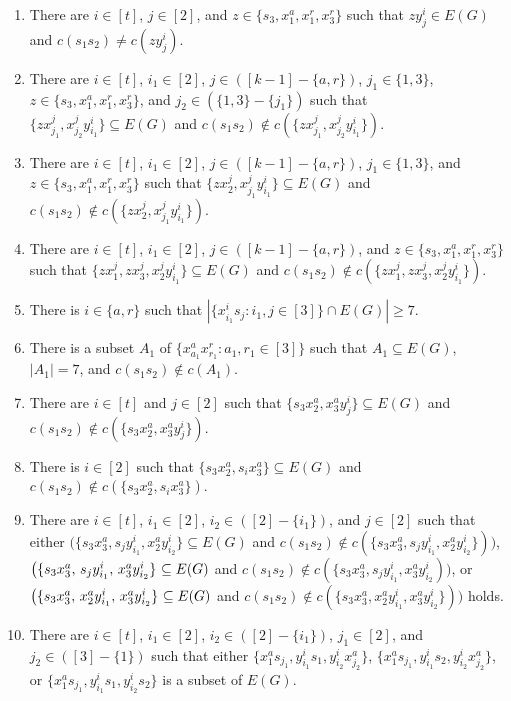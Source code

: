 \documentclass[12pt]{article}
\begin{document}
 \begin{enumerate}
   \item There are $i\in[t]$, $j\in[2]$, and $z\in\{s_3,x^a_1,x_1^r,x_3^r\}$ such that $zy^i_j\in E(G)$ and $c(s_1s_2)\neq c(zy^i_j)$. 
    \item There are $i\in[t]$, $i_1\in[2]$, $j\in([k-1]-\{a,r\})$, $j_1\in\{1,3\}$, $z\in\{s_3,x_1^a,x^r_1,x^r_3\}$, and $j_2\in(\{1,3\}-\{j_1\})$ such that $\{zx^j_{j_1},x^j_{j_2}y^i_{i_1}\}\subseteq E(G)$ and $c(s_1s_2)\not\in c(\{zx^j_{j_1},x^j_{j_2}y^i_{i_1}\})$.
   \item There are $i\in[t]$, $i_1\in[2]$, $j\in([k-1]-\{a,r\})$, $j_1\in\{1,3\}$, and $z\in\{s_3,x_1^a,x^r_1,x^r_3\}$ such that $\{zx^j_{2},x^j_{j_1}y^i_{i_1}\}\subseteq E(G)$ and $c(s_1s_2)\not\in c(\{zx^j_{2},x^j_{j_1}y^i_{i_1}\})$.
   \item There are $i\in[t]$, $i_1\in[2]$,  $j\in([k-1]-\{a,r\})$, and $z\in\{s_3,x_1^a,x^r_1,x^r_3\}$ such that $\{zx^j_{1},zx^j_3,x^j_{2}y^i_{i_1}\}\subseteq E(G)$ and $c(s_1s_2)\not\in c(\{zx^j_{1},zx^j_3,x^j_{2}y^i_{i_1}\})$.
   \item There is $i\in\{a,r\}$ such that $|\{x^i_{i_1}s_j:i_1,j\in[3]\}\cap E(G)|\geq7$.
   \item There is a subset $A_1$ of $\{x^a_{a_1}x^r_{r_1}:a_1,r_1\in[3]\}$ such that $A_1\subseteq E(G)$, $|A_1|=7$, and $c(s_1s_2)\not\in c(A_1)$.
    \item There are $i\in[t]$ and $j\in[2]$ such that $\{s_3x^a_{2},x^a_3y^i_{j}\}\subseteq E(G)$ and $c(s_1s_2)\not\in c(\{s_3x^a_{2},x^a_3y^i_{j}\})$.
    \item There is $i\in[2]$ such that $\{s_3x^a_{2},s_ix^a_3\}\subseteq E(G)$ and $c(s_1s_2)\not\in c(\{s_3x^a_{2},s_ix^a_3\})$.
    \item There are \(i\in[t]\), \(i_1\in[2]\), $i_2\in([2]-\{i_1\})$,  and \(j\in[2]\) such that  either \(\big(\{s_3x^a_3,s_jy^i_{i_1},x^a_2y^i_{i_2}\}\subseteq E(G)\) and $c(s_1s_2)\not\in c(\{s_3x^a_3,s_jy^i_{i_1},x^a_2y^i_{i_2}\})\big)$, \(\big(\{s_3x^a_3,$ $s_jy^i_{i_1},$ $x^a_3y^i_{i_2}\}$ $\subseteq E(G)\) and $c(s_1s_2)\not\in c(\{s_3x^a_3,s_jy^i_{i_1},x^a_3y^i_{i_2})\big)$, or \(\big(\{s_3x^a_3,$ $x^a_2y^i_{i_1},$ $x^a_3y^i_{i_2}\}$ $\subseteq E(G)\) and $c(s_1s_2)\not\in c(\{s_3x^a_3,x^a_2y^i_{i_1},x^a_3y^i_{i_2}\})\big)$ holds.
    \item There are $i\in[t]$, $i_1\in[2]$, $i_2\in([2]-\{i_1\})$, $j_1\in[2]$, and $j_2\in([3]-\{1\})$ such that either $\{x^a_1s_{j_1},y^i_{i_1}s_{1},y^i_{i_2}x^a_{j_2}\}$, $\{x^a_1s_{j_1},y^i_{i_1}s_{2},y^i_{i_2}x^a_{j_2}\}$, or $\{x^a_1s_{j_1},y^i_{i_1}s_{1},y^i_{i_2}s_2\}$ is a subset of $E(G)$.

\end{enumerate}
\end{document}
